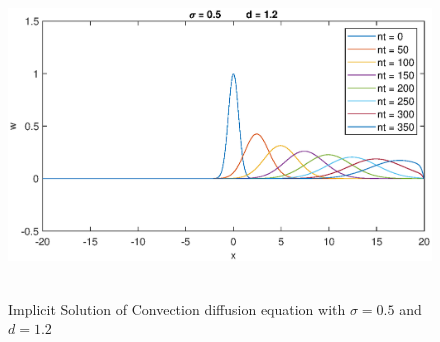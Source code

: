 \documentclass[letterpaper,12pt]{article}
\begin{document}
\begin{figure}[!ht] 
	\centering 
	\includegraphics[max height=8.5cm]{graphs/Bonus/sigma05d12.eps}
	\caption{Implicit Solution of Convection diffusion equation with $\sigma= 0.5$ and $d=1.2$}
	\label{fig:b_3}
\end{figure}

\newpage
\end{document}
